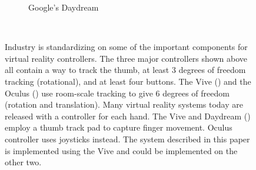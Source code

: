 \begin{figure}
\begin{subfigure}{.4\columnwidth}
  \caption{Google's Daydream}\label{fig:controllerDaydream}
  \end{subfigure}
  \caption{
  Industry is standardizing on some of the important components for virtual reality controllers.
  The three major controllers shown above all contain a way to track the thumb, at least 3 degrees of freedom tracking  (rotational), and at least four buttons.
  The Vive () and the Oculus () use room-scale tracking to give 6 degrees of freedom (rotation and translation).  
  Many virtual reality systems today are released with a controller for each hand.  
  The Vive and Daydream () employ a thumb track pad to capture finger movement.
  Oculus controller uses joysticks instead.
  The system described in this paper is implemented using the Vive and could be implemented on the other two.
  }~\label{fig:controllers}

\end{figure}



